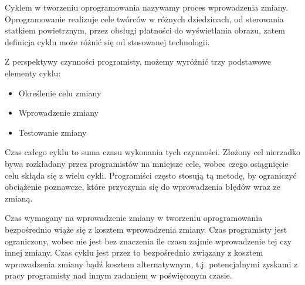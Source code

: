 Cyklem w tworzeniu oprogramowania nazywamy proces wprowadzenia zmiany.
Oprogramowanie realizuje cele twórców w różnych dziedzinach, od sterowania statkiem powietrznym,
przez obsługi płatności do wyświetlania obrazu, zatem definicja cyklu może różnić się od stosowanej technologii.

Z perspektywy czynności programisty, możemy wyróżnić trzy podstawowe elementy cyklu:
\begin{itemize}
    \item Określenie celu zmiany
    \item Wprowadzenie zmiany
    \item Testowanie zmiany
\end{itemize}

Czas całego cyklu to suma czasu wykonania tych czynności.
Złożony cel nierzadko bywa rozkładany przez programistów na mniejsze cele, wobec
czego osiągnięcie celu skłąda się z wielu cykli.
Programiści często stosują tą metodę, by ograniczyć obciążenie poznawcze, które przyczynia się do
wprowadzenia błędów wraz ze zmianą.


Czas wymagany na wprowadzenie zmiany w tworzeniu oprogramowania bezpośrednio wiąże się z kosztem
wprowadzenia zmiany.
Czas programisty jest ograniczony, wobec nie jest bez znaczenia ile czasu zajmie wprowadzenie
tej czy innej zmiany.
Czas cyklu jest przez to bezpośrednio związany z kosztem wprowadzenia zmiany bądź kosztem alternatywnym,
t.j. potencjalnymi zyskami z pracy programisty nad innym zadaniem w poświęconym czasie.

